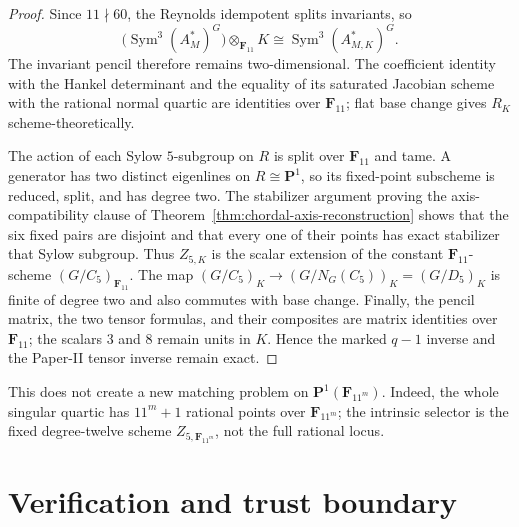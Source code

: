 \documentclass[11pt]{article}
\theoremstyle{definition}
\theoremstyle{remark}
\newcommand{\F}{\mathbf F}
\newcommand{\PP}{\mathbf P}
\newcommand{\Sym}{\operatorname{Sym}}
\begin{document}
\begin{proof}
Since \(11\nmid60\), the Reynolds idempotent splits invariants, so
\[
 \bigl(\Sym^3(A_M^*)^G\bigr)\otimes_{\F_{11}}K
 \cong \Sym^3(A_{M,K}^*)^G.
\]
The invariant pencil therefore remains two-dimensional.  The coefficient
identity with the Hankel determinant and the equality of its saturated
Jacobian scheme with the rational normal quartic are identities over
\(\F_{11}\); flat base change gives \(R_K\) scheme-theoretically.

The action of each Sylow \(5\)-subgroup on \(R\) is split over \(\F_{11}\)
and tame.  A generator has two distinct eigenlines on \(R\cong\PP^1\), so
its fixed-point subscheme is reduced, split, and has degree two.  The
stabilizer argument proving the axis-compatibility clause of
Theorem~\ref{thm:chordal-axis-reconstruction} shows that the six fixed pairs
are disjoint and that every one of their points has exact stabilizer that
Sylow subgroup.  Thus \(Z_{5,K}\) is the scalar extension of the constant
\(\F_{11}\)-scheme \((G/C_5)_{\F_{11}}\).  The map
\((G/C_5)_K\to (G/N_G(C_5))_K=(G/D_5)_K\) is finite of degree two and also
commutes with base change.  Finally, the pencil matrix, the two tensor formulas, and their
composites are matrix identities over \(\F_{11}\); the scalars \(3\) and
\(8\) remain units in \(K\).  Hence the marked \(q-1\) inverse and the
Paper-II tensor inverse remain exact.
\end{proof}

This does not create a new matching problem on
\(\PP^1(\F_{11^m})\).  Indeed, the whole singular quartic has
\(11^m+1\) rational points over \(\F_{11^m}\); the intrinsic selector is the
fixed degree-twelve scheme \(Z_{5,\F_{11^m}}\), not the full rational locus.

\section{Verification and trust boundary}
\label{sec:verification}
\end{document}
